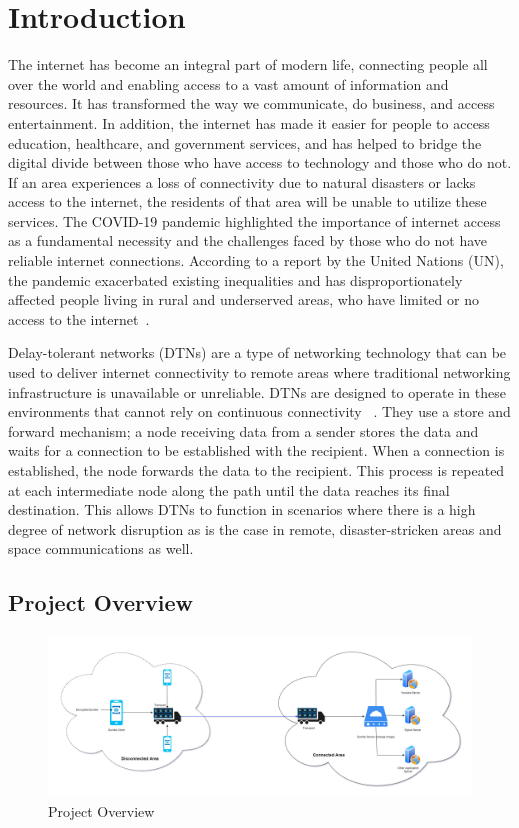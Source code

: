 \chapter{Introduction}

The internet has become an integral part of modern life, connecting people all over the world and enabling access to a vast amount of information and resources. It has transformed the way we communicate, do business, and access entertainment. In addition, the internet has made it easier for people to access education, healthcare, and government services, and has helped to bridge the digital divide between those who have access to technology and those who do not.
If an area experiences a loss of connectivity due to natural disasters or lacks access to the internet, the residents of that area will be unable to utilize these services. The COVID-19 pandemic highlighted the importance of internet access as a fundamental necessity and the challenges faced by those who do not have reliable internet connections. According to a report by the United Nations (UN), the pandemic exacerbated existing inequalities and has disproportionately affected people living in rural and underserved areas, who have limited or no access to the internet~\cite{unreport}.

Delay-tolerant networks (DTNs) are a type of networking technology that can be used to deliver internet connectivity to remote areas where traditional networking infrastructure is unavailable or unreliable. DTNs are designed to operate in these environments that cannot rely on continuous connectivity ~\cite{dtn_intro}. They use a store and forward mechanism; a node receiving data from a sender stores the data and waits for a connection to be established with the recipient. When a connection is established, the node forwards the data to the recipient. This process is repeated at each intermediate node along the path until the data reaches its final destination. This allows DTNs to function in scenarios where there is a high degree of network disruption as is the case in remote, disaster-stricken areas and space communications as well.


\section{Project Overview} 

\begin{figure}[ht!]
\centering
\includegraphics[width= 150mm]{./images/Introduction.png}
\caption{Project Overview}
\end{figure}

